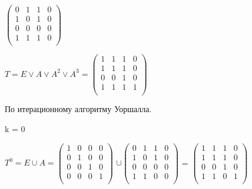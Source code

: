 \documentclass{article}
\begin{document}
$\begin{pmatrix}
		0 & 1 & 1 & 0 \\
		1 & 0 & 1 & 0 \\
		0 & 0 & 0 & 0 \\
		1 & 1 & 1 & 0 \\
	\end{pmatrix}$
\vspace{5mm}
\par
\hspace{8mm}
$T = E \vee A \vee A^2 \vee A^3 =
	\begin{pmatrix}
		1 & 1 & 1 & 0 \\
		1 & 1 & 1 & 0 \\
		0 & 0 & 1 & 0 \\
		1 & 1 & 1 & 1 \\
	\end{pmatrix}$
\vspace{5mm}
\par
\hspace{8mm}
\hspace*{-15mm} \centerline{По итерационному алгоритму Уоршалла.}
\hspace*{-15mm} \centerline{k = 0}
\vspace{5mm}
\par
\hspace{8mm} $T^0 = E ∪ A =
	\begin{pmatrix}
		1 & 0 & 0 & 0 \\
		0 & 1 & 0 & 0 \\
		0 & 0 & 1 & 0 \\
		0 & 0 & 0 & 1 \\
	\end{pmatrix}$
$∪\begin{pmatrix}
		0 & 1 & 1 & 0 \\
		1 & 0 & 1 & 0 \\
		0 & 0 & 0 & 0 \\
		1 & 1 & 0 & 0 \\
	\end{pmatrix}$ =
$\begin{pmatrix}
		1 & 1 & 1 & 0 \\
		1 & 1 & 1 & 0 \\
		0 & 0 & 1 & 0 \\
		1 & 1 & 0 & 1 \\
	\end{pmatrix}$
\vspace{5mm}
\par
\hspace{8mm}
\hspace*{55mm}{k = 1, k - 1 = 0}
\end{document}
